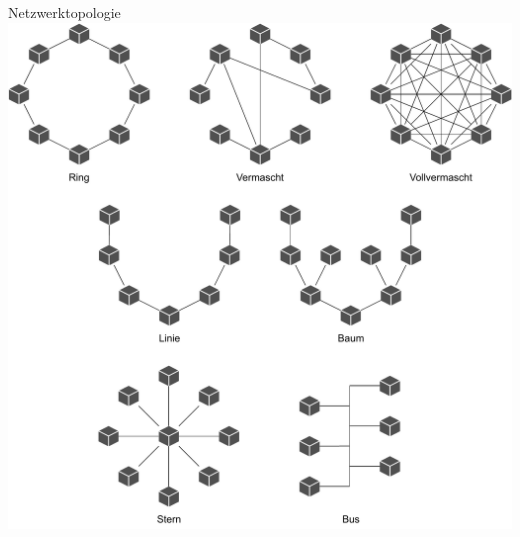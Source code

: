 \begin{defi}{Netzwerktopologie}
    \centering
    \includegraphics[width=\textwidth]{includes/figures/defi_topologien.pdf}


\end{defi}
